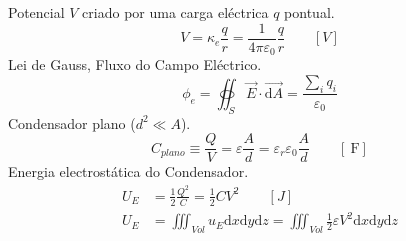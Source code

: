 \documentclass[a4paper,10pt]{extarticle} %
\begin{document}
\begin{multicols}{2}
{        Potencial \(V\)
criado por uma carga eléctrica \(q\) pontual.
        \begin{equation}
            V = \kappa_e \frac{q}{r} = \frac{1}{4\pi\varepsilon_0}\frac{q}{r} \qquad [V]
        \end{equation}
        Lei de Gauss, Fluxo do Campo Eléctrico.
        \begin{equation}
            \phi_e = \oiint_{S} \vec{E} \cdot \vec{\mathrm{d} A} = \frac{\sum\limits_i q_{i}}{\varepsilon_0} 
        \end{equation}
        Condensador plano (\( d^2 \ll A\)).
        \begin{equation}
            C_{plano} \equiv  \frac{Q}{V} = \varepsilon \frac{A}{d} = \varepsilon_r \varepsilon_0 \frac{A}{d}  \qquad [\SI{}{\farad}]
        \end{equation}
        Energia electrostática do Condensador.
        \begin{align}
            U_{E} & = \frac{1}{2} \frac{Q^2}{C}= \frac{1}{2} C V^2  \qquad [J]\\
            U_{E} & = \iiint_{Vol} u_E  \mathrm{d}x\mathrm{d}y  \mathrm{d}z  = \iiint_{Vol} \frac{1}{2} \varepsilon V^2 \mathrm{d}x\mathrm{d}y  \mathrm{d}z
        \end{align}
}


\end{multicols}
\end{document}

